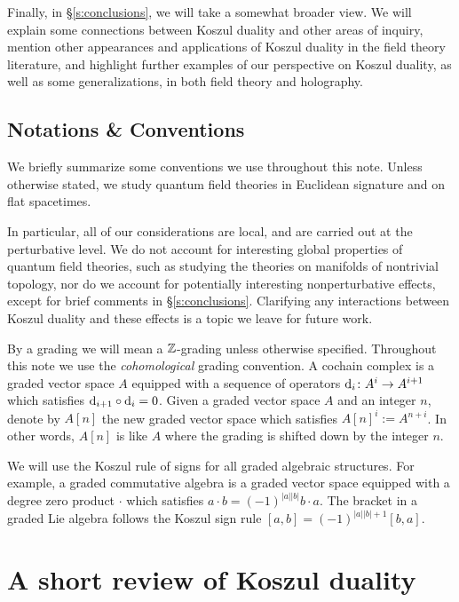 \documentclass[11pt]{amsart}
\def\natalie#1{{\textcolor{green!65!black}{NMP: {#1}}}}
\begin{document}
Finally, in \S \ref{s:conclusions}, we will take a somewhat broader view. We will explain some connections between Koszul duality and other areas of inquiry, mention other appearances and applications of Koszul duality in the field theory literature, and highlight further examples of our perspective on Koszul duality, as well as some generalizations, in both field theory and holography. 

\subsection*{Notations \& Conventions}

We briefly summarize some conventions we use throughout this note. Unless otherwise stated, we study quantum field theories in Euclidean signature and on flat spacetimes. 

In particular, all of our considerations are local, and are carried out at the perturbative level. We do not account for interesting global properties of quantum field theories, such as studying the theories on manifolds of nontrivial topology, nor do we account for potentially interesting nonperturbative effects, except for brief comments in \S \ref{s:conclusions}. 
Clarifying any interactions between Koszul duality and these effects is a topic we leave for future work. 

By a grading we will mean a $\mathbb Z$-grading unless otherwise specified. 
Throughout this note we use the {\em cohomological} grading convention.
A cochain complex is a graded vector space $A$ equipped with a sequence of operators ${\rm d}_i \colon A^i \to A^{i+1}$ which satisfies ${\rm d}_{i+1} \circ {\rm d}_i = 0$. 
Given a graded vector space $A$ and an integer $n$, denote by $A[n]$ the new graded vector space which satisfies $A[n]^i := A^{n+i}$. 
In other words, $A[n]$ is like $A$ where the grading is shifted down by the integer $n$.

We will use the Koszul rule of signs for all graded algebraic structures.
For example, a graded commutative algebra is a graded vector space equipped with a degree zero product $\cdot$ which satisfies $a \cdot b = (-1)^{|a||b|} b \cdot a$. 
The bracket in a graded Lie algebra follows the Koszul sign rule $[a, b] = (-1)^{|a||b|+1} [b, a]$.





\section{A short review of Koszul duality} \label{s:review}
\end{document}
